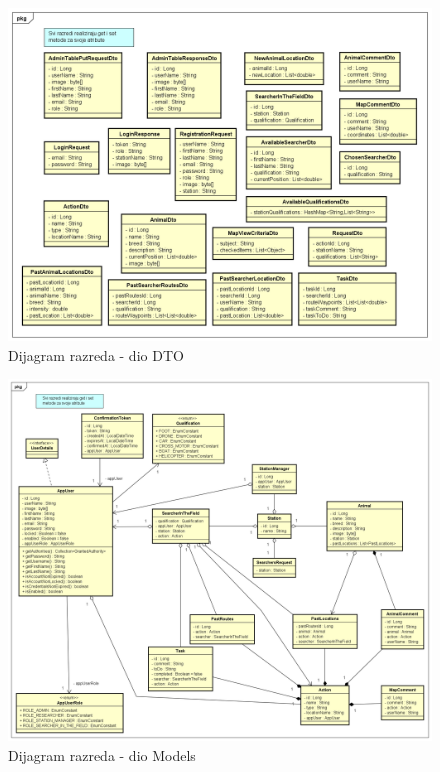 			\begin{figure}[H]
				\includegraphics[scale=0.5]{dijagrami/DTO.png} 
				\centering
				\caption{Dijagram razreda - dio DTO}
				\label{fig:promjene}
			\end{figure}
			
			\begin{figure}[H]
				\includegraphics[scale=0.4]{dijagrami/Model.png} 
				\centering
				\caption{Dijagram razreda - dio Models}
				\label{fig:promjene}
			\end{figure}
			
